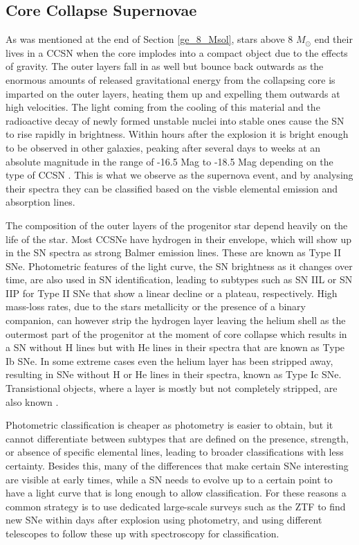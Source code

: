 \documentclass[a4paper,oneside,12pt, class=Latex/Classes/PhDthesisPSnPDF, crop=false]{standalone}
\begin{document}
\subsection{Core Collapse Supernovae}
\label{CCSN}
As was mentioned at the end of Section \ref{ge_8_Msol}, stars above 8 $M_\odot$ end their lives in a CCSN when the core implodes into a compact object due to the effects of gravity. The outer layers fall in as well but bounce back outwards as the enormous amounts of released gravitational energy from the collapsing core is imparted on the outer layers, heating them up and expelling them outwards at high velocities. The light coming from the cooling of this material and the radioactive decay of newly formed unstable nuclei into stable ones cause the SN to rise rapidly in brightness. Within hours after the explosion it is bright enough to be observed in other galaxies, peaking after several days to weeks at an absolute magnitude in the range of -16.5 Mag to -18.5 Mag depending on the type of CCSN \citep{SN_M_dist}. This is what we observe as the supernova event, and by analysing their spectra they can be classified based on the visble elemental emission and absorption lines.

The composition of the outer layers of the progenitor star depend heavily on the life of the star. Most CCSNe have hydrogen in their envelope, which will show up in the SN spectra as strong Balmer emission lines. These are known as Type II SNe. Photometric features of the light curve, the SN brightness as it changes over time, are also used in SN identification, leading to subtypes such as SN IIL or SN IIP for Type II SNe that show a linear decline or a plateau, respectively. High mass-loss rates, due to the stars metallicity or the presence of a binary companion, can however strip the hydrogen layer leaving the helium shell as the outermost part of the progenitor at the moment of core collapse which results in a SN without H lines but with He lines in their spectra that are known as Type Ib SNe. In some extreme cases even the helium layer has been stripped away, resulting in SNe without H or He lines in their spectra, known as Type Ic SNe. Transistional objects, where a layer is mostly but not completely stripped, are also known \citep{SN_large_pic}.

Photometric classification is cheaper as photometry is easier to obtain, but it cannot differentiate between subtypes that are defined on the presence, strength, or absence of specific elemental lines, leading to broader classifications with less certainty. Besides this, many of the differences that make certain SNe interesting are visible at early times, while a SN needs to evolve up to a certain point to have a light curve that is long enough to allow classification. For these reasons a common strategy is to use dedicated large-scale surveys such as the ZTF to find new SNe within days after explosion using photometry, and using different telescopes to follow these up with spectroscopy for classification.
\end{document}
